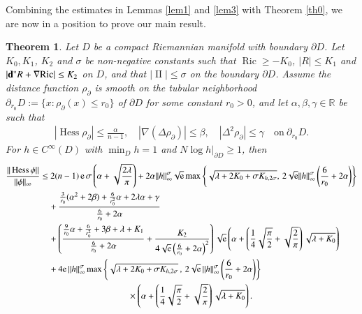 \documentclass[11pt,reqno]{amsart}
\newtheorem{theorem}{Theorem}[section]
\theoremstyle{definition} \newtheorem{remark}[theorem]{Remark}
\numberwithin{equation}{section}
\def\Ric{{\operatorname{Ric}}} \def\Hess{\operatorname{Hess}}
\newcommand\1{\mathbbm{1}}
\def\Ric{{\operatorname{Ric}}} \def\Aut{{\operatorname{Aut}}}
\def\bd{{\bf d}}
\def\r{\right}
\def\l{\left} \def\e{\operatorname{e}} \def\dsum{\displaystyle\sum}
\def\II{{\operatorname{II}}}
\begin{document}
Combining the estimates in Lemmas \ref{lem1} and \ref{lem3}  with
Theorem \ref{th0}, we are now in a position to prove our  main
result.

\begin{theorem}\label{main-th0}
Let $D$ be a compact Riemannian manifold with
boundary $\partial D$.
Let   $K_0,K_1$, $K_2$ and $\sigma$ be non-negative constants such that  $\Ric\geq -K_0$, $|R|\leq K_1$ and $|\bd^* R+\nabla \Ric|\leq K_2$ on $D$, and that   $|\II|\leq \sigma$ on the boundary $\partial D$. Assume  the distance function  $\rho_{\partial}$ is smooth on the tubular neighborhood $\partial_{r_0}D:=\{x: \rho_{\partial }(x)\leq r_0\}$ of
$\partial D$ for some constant $r_0>0$, and let $\alpha, \beta, \gamma \in \mathbb{R}$ be such that
  \begin{align}\label{condition-rho1}
  |\Hess \rho_{\partial }|\leq \frac{\alpha}{n-1},\quad |\nabla (\Delta \rho_{\partial })|\leq \beta,\quad |\Delta^2 \rho_{\partial}|\leq \gamma \quad 
    \mbox{on}\ \partial_{r_0}D.
  \end{align}
  For $h\in C^{\infty}(D)$ with
$\min_Dh =1$ and $N\log h|_{\partial D}\geq 1$, 
then 
\begin{align}\label{add-Hess-D2}
\frac{\|\Hess \phi\|}{\|\phi\|_{\infty}}
&\leq  2(n-1)\e \sigma  \l(\alpha+\sqrt{\frac{2\lambda}{\pi}}\r)+2\alpha\|h\|_{\infty}^{\sigma}\sqrt{\e} \max \l\{\sqrt{\lambda+2K_0+\sigma K_{h,2\sigma}},\, 2\sqrt{\e}\|h\|_{\infty}^{\sigma}\left( \frac{6}{r_0}+2\alpha\right)\r\} \notag\\
&\quad + \frac{\frac{3}{r_0}(\alpha^2+2\beta)+ \frac{6}{r_0^2}\alpha +2\lambda \alpha+\gamma}{ \frac{6}{r_0}+2\alpha}\notag\\
&\quad+\l(\frac{\frac{9}{r_0} \alpha + \frac{6}{r_0^2}  + 3\beta +\lambda +K_1}{ \frac{6}{r_0}+2\alpha}  +\frac{K_2}{4\sqrt{\e}\left( \frac{6}{r_0}+2\alpha\right)^2}\r) \sqrt{\e}\l(\alpha +\l(\frac{1}{4}\sqrt{\frac{\pi}{2}}+\sqrt{\frac{2}{\pi}}\r)\sqrt{\lambda+K_0}\r) \notag\\
  &\quad + 4{\e}\,\|h\|_{\infty}^{\sigma}  \max \l\{\sqrt{\lambda+2K_0+\sigma K_{h,2\sigma}}\,,\, 2\sqrt{\e}\,\|h\|_{\infty}^{\sigma}\left( \frac{6}{r_0}+2\alpha\right)\r\}\notag\\
  &\qquad\qquad\qquad\qquad\qquad\times\l(\alpha +\l(\frac{1}{4}\sqrt{\frac{\pi}{2}}+\sqrt{\frac{2}{\pi}}\r)\sqrt{\lambda+K_0}\r).
\end{align}

\end{theorem}
\end{document}
